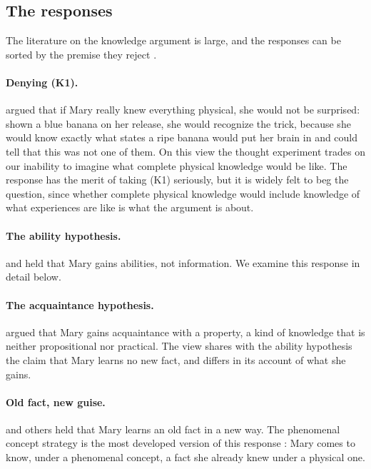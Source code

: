 \documentclass{situationist-preprint}
\begin{document}
\subsection{The responses}

The literature on the knowledge argument is large, and the responses can be sorted by the premise they reject \citep{LudlowNagasawaStoljar2004}.

\paragraph{Denying (K1).} \citet{Dennett1991} argued that if Mary really knew everything physical, she would not be surprised: shown a blue banana on her release, she would recognize the trick, because she would know exactly what states a ripe banana would put her brain in and could tell that this was not one of them. On this view the thought experiment trades on our inability to imagine what complete physical knowledge would be like. The response has the merit of taking (K1) seriously, but it is widely felt to beg the question, since whether complete physical knowledge would include knowledge of what experiences are like is what the argument is about.

\paragraph{The ability hypothesis.} \citet{Lewis1988} and \citet{Nemirow1990} held that Mary gains abilities, not information. We examine this response in detail below.

\paragraph{The acquaintance hypothesis.} \citet{Conee1994} argued that Mary gains acquaintance with a property, a kind of knowledge that is neither propositional nor practical. The view shares with the ability hypothesis the claim that Mary learns no new fact, and differs in its account of what she gains.

\paragraph{Old fact, new guise.} \citet{Horgan1984} and others held that Mary learns an old fact in a new way. The phenomenal concept strategy is the most developed version of this response \citep{Loar1990,Papineau2002}: Mary comes to know, under a phenomenal concept, a fact she already knew under a physical one.
\end{document}
